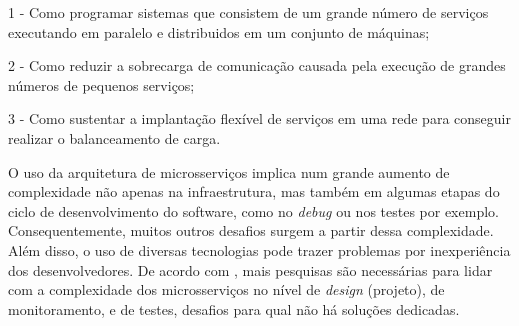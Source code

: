 1 - Como programar sistemas que consistem de um grande número de serviços executando em paralelo e distribuidos em um conjunto de máquinas;

2 - Como reduzir a sobrecarga de comunicação causada pela execução de grandes números de pequenos serviços;

3 - Como sustentar a implantação flexível de serviços em uma rede para conseguir realizar o balanceamento de carga.

O uso da arquitetura de microsserviços implica num grande aumento de complexidade não apenas na infraestrutura, mas também em algumas etapas do ciclo de desenvolvimento do software, como no \emph{debug} ou nos testes por exemplo. Consequentemente, muitos outros desafios surgem a partir dessa complexidade. Além disso, o uso de diversas tecnologias pode trazer problemas por inexperiência dos desenvolvedores. De acordo com , mais pesquisas são necessárias para lidar com a complexidade dos microsserviços no nível de \emph{design} (projeto), de monitoramento, e de testes, desafios para qual não há soluções dedicadas.








